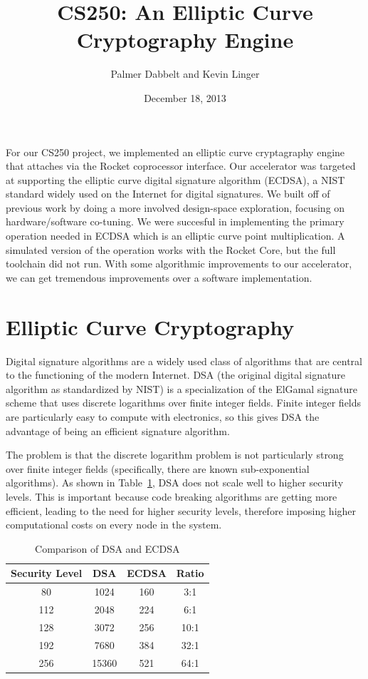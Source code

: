 \documentclass[twocolumn]{article}
\title{CS250: An Elliptic Curve Cryptography Engine}
\author{Palmer Dabbelt and Kevin Linger}
\date{December 18, 2013}
\begin{document}
\maketitle

For our CS250 project, we implemented an elliptic curve cryptagraphy
engine that attaches via the Rocket coprocessor interface.  Our
accelerator was targeted at supporting the elliptic curve digital
signature algorithm (ECDSA), a NIST standard widely used on the
Internet for digital signatures.  We built off of previous work by
doing a more involved design-space exploration, focusing on
hardware/software co-tuning. We were succesful in implementing the
primary operation needed in ECDSA which is an elliptic curve point 
multiplication. A simulated version of the operation works with the
Rocket Core, but the full toolchain did not run. With some algorithmic
improvements to our accelerator, we can get tremendous improvements
over a software implementation.

\section{Elliptic Curve Cryptography}

Digital signature algorithms\cite{fips-186-3} are a widely used class
of algorithms that are central to the functioning of the modern
Internet.  DSA\cite{us-dsa} (the original digital signature algorithm
as standardized by NIST) is a specialization of the ElGamal signature
scheme\cite{elgamal-sig} that uses discrete logarithms over finite
integer fields.  Finite integer fields are particularly easy to
compute with electronics, so this gives DSA the advantage of being an
efficient signature algorithm.

The problem is that the discrete logarithm problem is not particularly
strong over finite integer fields (specifically, there are known
sub-exponential algorithms\cite{adleman-subexp}).  As shown in
Table~\ref{key-sizes}, DSA does not scale well to higher security
levels.  This is important because code breaking algorithms are
getting more efficient, leading to the need for higher security
levels, therefore imposing higher computational costs on every node in
the system. 

\begin{table}[h]
  \begin{center}
    \begin{tabular}{cccc}
      Security Level & DSA & ECDSA & Ratio \\
      \hline
      80 & 1024 & 160 & 3:1 \\
      112 & 2048 & 224 & 6:1 \\
      128 & 3072 & 256 & 10:1 \\
      192 & 7680 & 384 & 32:1 \\
      256 & 15360 & 521 & 64:1 \\
    \end{tabular}
  \end{center}

  \caption{Comparison of DSA and ECDSA\cite{nsa-case_for_ecc}
    \label{key-sizes}}
\end{table}
\end{document}
